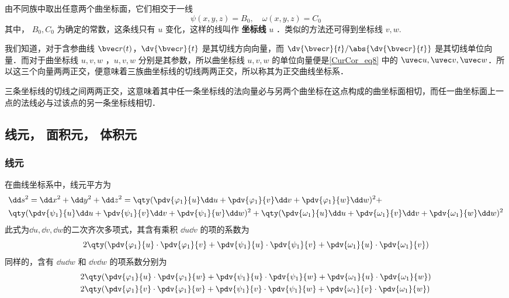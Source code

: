 由不同族中取出任意两个曲坐标面，它们相交于一线
\begin{equation}
\psi(x,y,z)=B_0,\quad \omega(x,y,z)=C_0
\end{equation}
其中， $B_0,C_0$ 为确定的常数，这条线只有 $u$ 变化，这样的线叫作 \textbf{坐标线} $u$ ．类似的方法还可得到坐标线 $v,w$.

我们知道，对于含参曲线 $\bvec r(t)$，$\dv{\bvec r}{t}$ 是其切线方向向量，而 $\dv{\bvec r}{t}/\abs{\dv{\bvec r}{t}}$ 是其切线单位向量．而对于曲坐标线 $u,v,w$ ，$u,v,w$ 分别是其参数，所以曲坐标线 $u,v,w$ 的单位向量便是\autoref{CurCor_eq8} 中的 $\uvec u,\uvec v,\uvec w$．所以这三个向量两两正交，便意味着三族曲坐标线的切线两两正交，所以称其为正交曲线坐标系．

三条坐标线的切线之间两两正交，这意味着其中任一条坐标线的法向量必与另两个曲坐标在这点构成的曲坐标面相切，而任一曲坐标面上一点的法线必与过该点的另一条坐标线相切．

\subsection{线元， 面积元， 体积元}
\subsubsection{线元}
在曲线坐标系中，线元平方为
\begin{equation}\label{CurCor_eq1}
\begin{aligned}
&\dd s^2=\dd x^2+\dd y^2+\dd z^2=\qty(\pdv{\varphi_1}{u}\dd u+\pdv{\varphi_1}{v}\dd v+\pdv{\varphi_1}{w}\dd w)^2+\\ 
&\qty(\pdv{\psi_1}{u}\dd u+\pdv{\psi_1}{v}\dd v+\pdv{\psi_1}{w}\dd w)^2+\qty(\pdv{\omega_1}{u}\dd u+\pdv{\omega_1}{v}\dd v+\pdv{\omega_1}{w}\dd w)^2
\end{aligned}
\end{equation}
此式为$\dd u,\dd v,\dd w$的二次齐次多项式，其含有乘积 $\dd u \dd v$ 的项的系数为
\begin{equation}
2\qty(\pdv{\varphi_1}{u}\cdot\pdv{\varphi_1}{v}+\pdv{\psi_1}{u}\cdot\pdv{\psi_1}{v}+\pdv{\omega_1}{u}\cdot\pdv{\omega_1}{v})
\end{equation}
同样的，含有 $\dd u\dd w$ 和 $\dd v\dd w$ 的项系数分别为
\begin{equation}
\begin{aligned}
& 2\qty(\pdv{\varphi_1}{u}\cdot\pdv{\varphi_1}{w}+\pdv{\psi_1}{u}\cdot\pdv{\psi_1}{w}+\pdv{\omega_1}{u}\cdot\pdv{\omega_1}{w})\\
&2\qty(\pdv{\varphi_1}{v}\cdot\pdv{\varphi_1}{w}+\pdv{\psi_1}{v}\cdot\pdv{\psi_1}{w}+\pdv{\omega_1}{v}\cdot\pdv{\omega_1}{w})
\end{aligned}
\end{equation}

